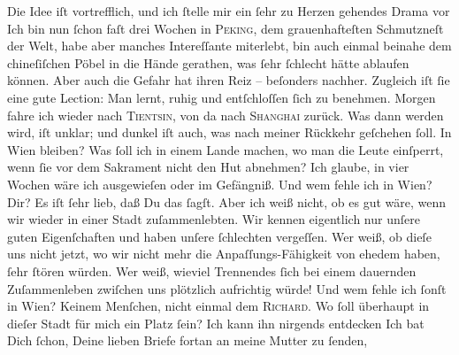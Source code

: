 \begin{ledgroupsized}[t]{13cm}
               Die Idee iſt vortrefflich, und ich ſtelle mir ein ſehr zu Herzen gehendes Drama vor{\dotsfive}\pend
           \pstart
           Ich bin nun ſchon faſt drei Wochen in \textsc{Peking}, dem grauenhafteſten Schmutzneſt der Welt, habe aber manches Intereſſante
               miterlebt, bin auch einmal beinahe dem chineſiſchen Pöbel in die Hände gerathen, was ſehr ſchlecht
               hätte ablaufen können. Aber auch die Gefahr hat ihren Reiz – beſonders \strikeout{\textcolor{gray}{×}\-\textcolor{gray}{×}\-\textcolor{gray}{×}} nachher. Zugleich iſt ſie eine gute Lection: Man lernt, ruhig und entſchloſſen
               ſich zu benehmen. Morgen fahre {\pb}ich wieder nach \textsc{Tientsin}, von da nach \textsc{Shanghai} zurück. Was dann werden wird, iſt unklar; und dunkel iſt auch, was nach meiner
               Rückkehr geſchehen ſoll. In Wien bleiben? Was ſoll
               ich in einem Lande machen, wo
               man die Leute einſperrt, wenn ſie vor dem Sakrament nicht den Hut abnehmen? Ich
               glaube, in vier Wochen wäre ich ausgewieſen oder im Gefängniß. Und wem fehle ich in
                  Wien? Dir? Es iſt ſehr lieb, daß Du das ſagſt.
               Aber ich \strikeout{\textcolor{gray}{×}} weiß nicht, ob es gut wäre, wenn wir wieder in einer Stadt {\pb}zuſammenlebten. Wir kennen eigentlich nur unſere
               guten Eigenſchaften und haben unſere ſchlechten vergeſſen. Wer weiß,  ob dieſe uns nicht jetzt, wo wir nicht mehr die
               Anpaſſungs-Fähigkeit von ehedem haben, ſehr ſtören  würden. Wer weiß,  wieviel
               Trennendes ſich bei einem dauernden Zuſammenleben zwiſchen uns plötzlich aufrichtig
               würde! Und wem fehle ich ſonſt in Wien? Keinem
               Menſchen, nicht einmal dem \textsc{Richard}. Wo ſoll überhaupt in dieſer Stadt für mich ein Platz ſein? Ich kann ihn nirgends entdecken{\dotsfive}\pend
           \pstart
           Ich  bat Dich ſchon, Deine {\pb}lieben Briefe fortan
               an meine Mutter zu ſenden,

\end{ledgroupsized}

